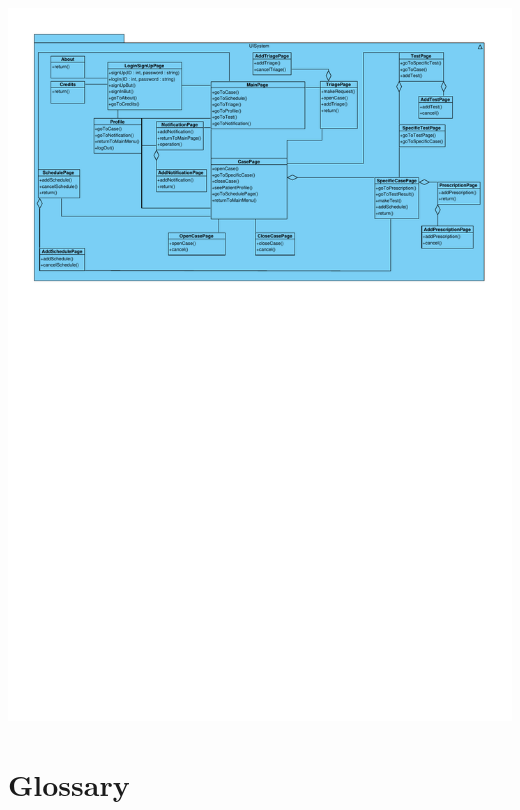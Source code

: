 \documentclass[a4paper, 12pt, titlepage]{article}
\begin{document}
  \includegraphics[width=\linewidth]{uisystem}

  \pagebreak
  \section{Glossary}
\end{document}
